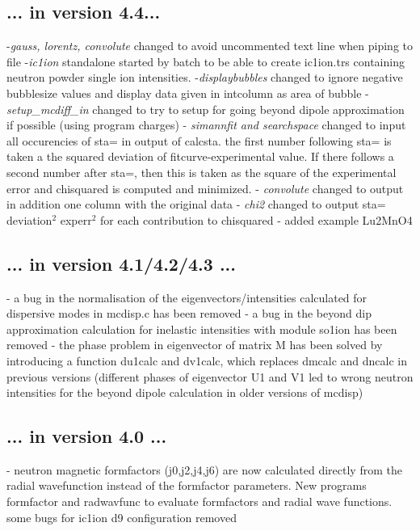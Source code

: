 \documentclass[twoside]{article}
\newcommand{\prg}{\sl}
\begin{document}
\subsection*{... in version 4.4...}
          -{\prg gauss, lorentz, convolute}  changed to avoid uncommented text line when piping to file
           -{\prg ic1ion} standalone started by batch to be able to create ic1ion.trs containing neutron 
           powder single ion intensities.
           -{\prg displaybubbles} changed to ignore negative bubblesize values and display data given in intcolumn as area of bubble
           -{\prg setup\_mcdiff\_in} changed to try to setup for going beyond dipole approximation if possible (using program charges)
           - {\prg simannfit and searchspace} changed to input all occurencies of sta= in output of
             calcsta. the first number following sta= is taken a the squared deviation of
             fitcurve-experimental value. If there follows a second number after sta=, then this
             is taken as the square of the experimental error and chisquared is computed and
             minimized.
           - {\prg convolute} changed to output in addition one column with the original data
           - {\prg chi2} changed to output sta= deviation$^2$ experr$^2$ for each contribution to chisquared
           - added example Lu2MnO4

\subsection*{... in version 4.1/4.2/4.3 ...}
- a bug in the normalisation of the eigenvectors/intensities calculated for dispersive modes in mcdisp.c has been removed
- a bug in the beyond dip approximation calculation for inelastic intensities with module so1ion has been removed
- the phase problem in eigenvector of matrix M has been solved by introducing a function du1calc and dv1calc, which
replaces dmcalc and dncalc in previous versions (different phases of eigenvector U1 and V1 led to wrong neutron intensities
for the beyond dipole calculation in older versions of mcdisp)

\subsection*{... in version 4.0 ...}

- neutron magnetic formfactors (j0,j2,j4,j6)  are now calculated directly from the radial wavefunction instead of the 
formfactor parameters. New programs formfactor and radwavfunc to evaluate formfactors and radial wave functions.
some bugs for ic1ion d9 configuration removed
\end{document}
